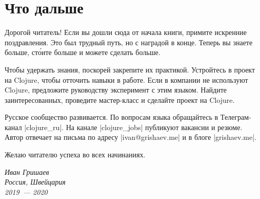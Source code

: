 \chapter{Что дальше}

Дорогой читатель! Если вы дошли сюда от начала книги, примите искренние
поздравления. Это был трудный путь, но с наградой в конце. Теперь вы знаете
больше, ст\'{о}ите больше и можете сделать больше.

Чтобы удержать знания, поскорей закрепите их практикой. Устройтесь в проект на
Clojure, чтобы отточить навыки в работе. Если в компании не используют Clojure,
предложите руководству эксперимент с этим языком. Найдите заинтересованных,
проведите мастер-класс и сделайте проект на Clojure.

Русское сообщество развивается. По вопросам языка обращайтесь в Телеграм-канал
\spverb|clojure_ru|. На канале \spverb|clojure_jobs| публикуют вакансии и
резюме. Автор отвечает на письма по адресу \spverb|ivan@grishaev.me| и в блоге
\spverb|grishaev.me|.

Желаю читателю успеха во всех начинаниях.

\vspace{1em}

\noindent
\textit{Иван Гришаев\\Россия, Швейцария\\2019~--- 2020}
